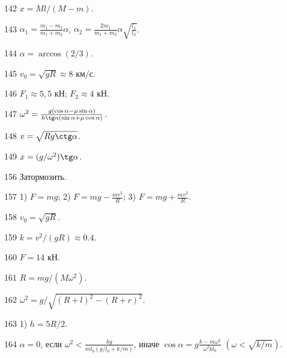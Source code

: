 \begin{Answer}{142}
$x = Ml/(M-m)$.
\end{Answer}
\begin{Answer}{143}
$\alpha_1 =\frac{m_1-m_2}{m_1+m_2}\alpha$, $\alpha_2 =\frac{2m_1}{m_1+m_2}\alpha \sqrt{\frac{l_1}{l_2}}$.
\end{Answer}
\begin{Answer}{144}
$\alpha = \arccos(2/3)$.
\end{Answer}
\begin{Answer}{145}
$v_0 = \sqrt{gR} \approx 8$ км/с.
\end{Answer}
\begin{Answer}{146}
$F_1 \approx 5,5$ кН; $F_2 \approx 4$ кН.
\end{Answer}
\begin{Answer}{147}
$\omega^2 = \frac{g(\cos \alpha - \mu \sin \alpha)}{h \tg \alpha (\sin \alpha + \mu \cos \alpha)}$.
\end{Answer}
\begin{Answer}{148}
$v = \sqrt{Rg \ctg \alpha}$.
\end{Answer}
\begin{Answer}{149}
$x = (g/\omega^2) \tg \alpha$.
\end{Answer}
\begin{Answer}{156}
Затормозить.
\end{Answer}
\begin{Answer}{157}
1) $F=mg$; 2) $F=mg-\frac{mv^2}{R}$; 3) $F=mg+\frac{mv^2}{R}$.
\end{Answer}
\begin{Answer}{158}
$v_0 = \sqrt{gR}$.
\end{Answer}
\begin{Answer}{159}
$k=v^2/(gR) \approx 0.4$.
\end{Answer}
\begin{Answer}{160}
$F = 14$ кН.
\end{Answer}
\begin{Answer}{161}
$R = mg/(M\omega^2)$.
\end{Answer}
\begin{Answer}{162}
$\omega^2 = g/\sqrt{(R+l)^2-(R+r)^2}$.
\end{Answer}
\begin{Answer}{163}
1) $h=5R/2$.
\end{Answer}
\begin{Answer}{164}
$\alpha = 0$, если $\omega^2 < \frac{kg}{ml_0(g/l_0 + k/m)}$, иначе $\cos \alpha = g\frac{k-m\omega^2}{\omega^2kl_0}$ $\left( \omega < \sqrt{k/m} \right)$.
\end{Answer}

